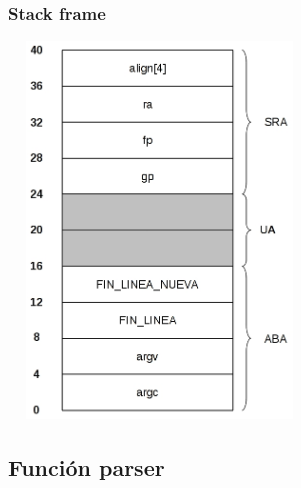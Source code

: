 \documentclass[a4paper,10pt]{article}
\begin{document}
    \subsubsection{Stack frame}
      \begin{center}
	\includegraphics[width=8cm, height=10cm]{DibujosStackFrame/stack-main.jpg}
      \end{center}

  \subsection{Funci\'on parser}
\end{document}
